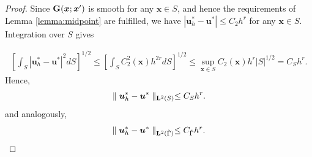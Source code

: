 \documentclass[10pt,a4paper]{amsart}
\begin{document}
 \begin{proof}
     Since ${\bf G}(\boldsymbol{x};\boldsymbol{x}')$ is smooth for any $\boldsymbol{x} \in S$, and hence the requirements of Lemma \ref{lemma:midpoint} are fulfilled, we have $|{\boldsymbol u}_h^* - {\boldsymbol u}^*| \le C_2 h^{r}$ for any $\boldsymbol{x} \in S$. Integration over $S$ gives

\begin{equation*}
\begin{split}  
 \left[\int_{S}| \boldsymbol{u}_{h}^*-\boldsymbol{u}^*|^{2} d{S}\right]^{1/2}\leq \left[\int_{S}C_2^{2}({\boldsymbol{x}})h^{2r} d{S}\right]^{1/2}\le \sup_{\boldsymbol{x} \in S}C_2({\boldsymbol{x}})h^{r} |{S}|^{1/2}=C_S h^{r}.
\end{split}
\end{equation*}
Hence,
\begin{equation}
\parallel \boldsymbol{u}_{h}^*-\boldsymbol{u}^*\parallel _{{\bf L}^{2}(S
)}\leq {C_S}h^{r}.
\label{two}
\end{equation}
and analogously,
\begin{equation}
\parallel \boldsymbol{u}_{h}^*-\boldsymbol{u}^*\parallel _{{\bf L}^{2}(\Tilde{\Gamma}
)}\leq {C_{\tilde{\Gamma}}}h^{r}.
\label{three}
\end{equation}
\end{proof}
\end{document}

